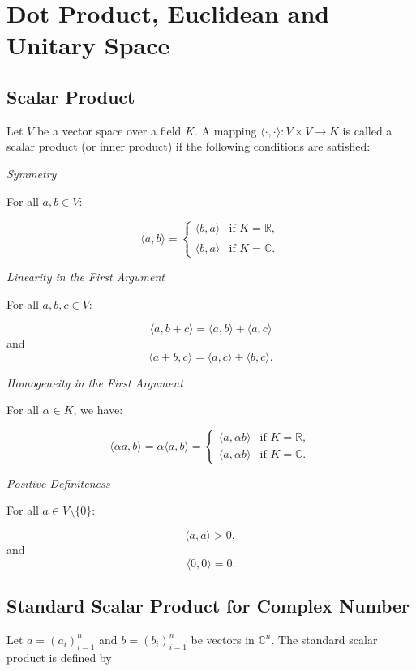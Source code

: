 \section{Dot Product, Euclidean and Unitary Space}

\subsection{Scalar Product}

Let \(V\) be a vector space over a field \(K\). A mapping \(\langle \cdot, \cdot \rangle : V \times V \to K\) is called a scalar product (or inner product) if the following conditions are satisfied:

\emph{Symmetry}

For all \(a, b \in V\):

\[
\langle a, b \rangle = 
\begin{cases}
\langle b, a \rangle & \text{if } K = \mathbb{R}, \\
\overline{\langle b, a \rangle} & \text{if } K = \mathbb{C}.
\end{cases}
\]

\emph{Linearity in the First Argument}

For all \(a, b, c \in V\):

\[
\langle a, b + c \rangle = \langle a, b \rangle + \langle a, c \rangle
\]
and
\[
\langle a + b, c \rangle = \langle a, c \rangle + \langle b, c \rangle.
\]

\emph{Homogeneity in the First Argument}

For all \(\alpha \in K\), we have:

\[
\langle \alpha a, b \rangle = \alpha \langle a, b \rangle = 
\begin{cases}
\langle a, \alpha b \rangle & \text{if } K = \mathbb{R}, \\
\langle a, \alpha b \rangle & \text{if } K = \mathbb{C}.
\end{cases}
\]

\emph{Positive Definiteness}

For all \(a \in V \setminus \{0\}\):

\[
\langle a, a \rangle > 0,
\]
and
\[
\langle 0, 0 \rangle = 0.
\]

\subsection{Standard Scalar Product for Complex Number}

Let \( a = (a_i)_{i=1}^n \) and \( b = (b_i)_{i=1}^n \) be vectors in \( \mathbb{C}^n \). The standard scalar product is defined by

